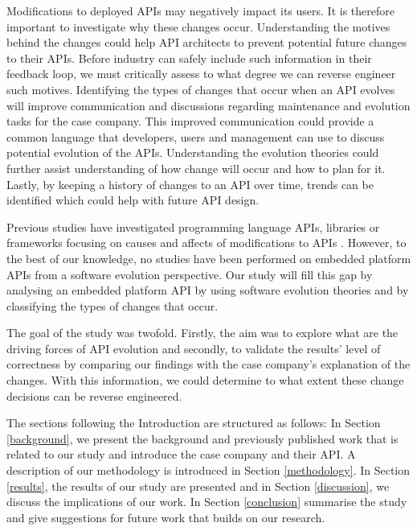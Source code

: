 \documentclass{sig-alternate}
\begin{document}
Modifications to deployed APIs may negatively impact its users. It is therefore important to investigate why these changes occur. Understanding the motives behind the changes could help API architects to prevent potential future changes to their APIs. Before industry can safely include such information in their feedback loop, we must critically assess to what degree we can reverse engineer such motives. 
Identifying the types of changes that occur when an API evolves will improve communication and discussions regarding maintenance and evolution tasks for the case company. This improved communication could provide a common language that developers, users and management can use to discuss potential evolution of the APIs. Understanding the evolution theories could further assist understanding of how change will occur and how to plan for it. Lastly, by keeping a history of changes to an API over time, trends can be identified which could help with future API design.

Previous studies have investigated programming language APIs, libraries or frameworks focusing on causes and affects of modifications to APIs \cite{dig2005role, hou2011exploring, shi2011empirical}. However, to the best of our knowledge, no studies have been performed on embedded platform APIs from a software evolution perspective. Our study will fill this gap by analysing an embedded platform API by using software evolution theories and by classifying the types of changes that occur.

The goal of the study was twofold. Firstly, the aim was to explore what are the driving forces of API evolution and secondly, to validate the results' level of correctness by comparing our findings with the case company's explanation of the changes. With this information, we could determine to what extent these change decisions can be reverse engineered. 

The sections following the Introduction are structured as follows: In Section \ref{background}, we present the background and previously published work that is related to our study and introduce the case company and their API. A description of our methodology is introduced in Section \ref{methodology}. In Section \ref{results}, the results of our study are presented and in Section \ref{discussion}, we discuss the implications of our work. In Section \ref{conclusion} summarise the study and give suggestions for future work that builds on our research. 
\end{document}
